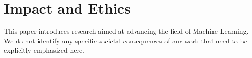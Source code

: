 \section{Impact and Ethics}
\label{sec:impactStatement}
This paper introduces research aimed at advancing the field of Machine Learning. We do not identify any specific societal consequences of our work that need to be explicitly emphasized here.